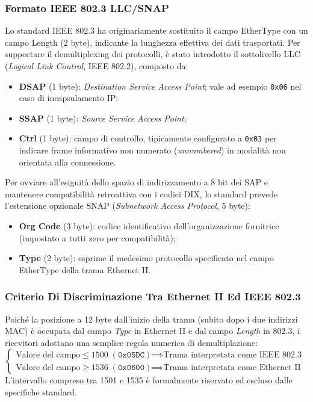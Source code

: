 \documentclass[11pt, a4paper]{article}
\begin{document}
\subsubsection{Formato IEEE 802.3 LLC/SNAP}
Lo standard IEEE 802.3 ha originariamente sostituito il campo EtherType con un campo Length (2 byte), indicante la lunghezza effettiva dei dati trasportati. Per supportare il demultiplexing dei protocolli, è stato introdotto il sottolivello LLC (\emph{Logical Link Control}, IEEE 802.2), composto da:
\begin{itemize}[noitemsep]
    \item \textbf{DSAP} (1 byte): \emph{Destination Service Access Point}; vale ad esempio \texttt{0x06} nel caso di incapsulamento IP;
    \item \textbf{SSAP} (1 byte): \emph{Source Service Access Point};
    \item \textbf{Ctrl} (1 byte): campo di controllo, tipicamente configurato a \texttt{0x03} per indicare frame informativo non numerato (\emph{unnumbered}) in modalità non orientata alla connessione.
\end{itemize}
Per ovviare all'esiguità dello spazio di indirizzamento a 8 bit dei SAP e mantenere compatibilità retroattiva con i codici DIX, lo standard prevede l'estensione opzionale SNAP (\emph{Subnetwork Access Protocol}, 5 byte):
\begin{itemize}[noitemsep]
    \item \textbf{Org Code} (3 byte): codice identificativo dell'organizzazione fornitrice (impostato a tutti zero per compatibilità);
    \item \textbf{Type} (2 byte): esprime il medesimo protocollo specificato nel campo EtherType della trama Ethernet II.
\end{itemize}

\subsubsection{Criterio Di Discriminazione Tra Ethernet II Ed IEEE 802.3}
Poiché la posizione a 12 byte dall'inizio della trama (subito dopo i due indirizzi MAC) è occupata dal campo \emph{Type} in Ethernet II e dal campo \emph{Length} in 802.3, i ricevitori adottano una semplice regola numerica di demultiplazione:
\begin{equation}
    \begin{cases}
        \text{Valore del campo} \le 1500 \; (\texttt{0x05DC}) & \implies \text{Trama interpretata come IEEE 802.3 (Length)} \\
        \text{Valore del campo} \ge 1536 \; (\texttt{0x0600}) & \implies \text{Trama interpretata come Ethernet II (Type)}
    \end{cases}
\end{equation}
L'intervallo compreso tra 1501 e 1535 è formalmente riservato ed escluso dalle specifiche standard.
\end{document}
